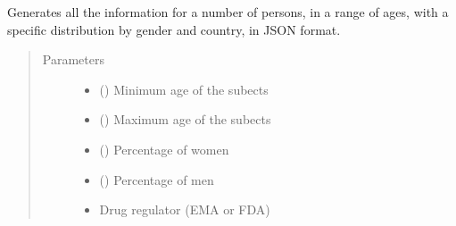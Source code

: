 \documentclass[letterpaper,10pt,english]{sphinxmanual}
\begin{document}
\begin{fulllineitems}
\label{\detokenize{CE_app.synth_person:CE_app.synth_person.functions.func_nihpo_person_creation}}
\sphinxAtStartPar
Generates all the information for a number of persons, in a range of ages, with a specific distribution by gender and country, in JSON format.
\begin{quote}\begin{description}
\item[{Parameters}] \leavevmode\begin{itemize}
\item {} 
\sphinxAtStartPar
{} () \textendash{} Minimum age of the subects

\item {} 
\sphinxAtStartPar
{} () \textendash{} Maximum age of the subects

\item {} 
\sphinxAtStartPar
{} (\sphinxstyleliteralemphasis{\sphinxupquote{ (}}\sphinxstyleliteralemphasis{\sphinxupquote{)}}) \textendash{} Percentage of women

\item {} 
\sphinxAtStartPar
{} (\sphinxstyleliteralemphasis{\sphinxupquote{ (}}\sphinxstyleliteralemphasis{\sphinxupquote{)}}) \textendash{} Percentage of men

\item {} 
\sphinxAtStartPar
{} \textendash{} Drug regulator (EMA or FDA)


\end{itemize}
\end{description}
\end{quote}
\end{fulllineitems}
\end{document}
